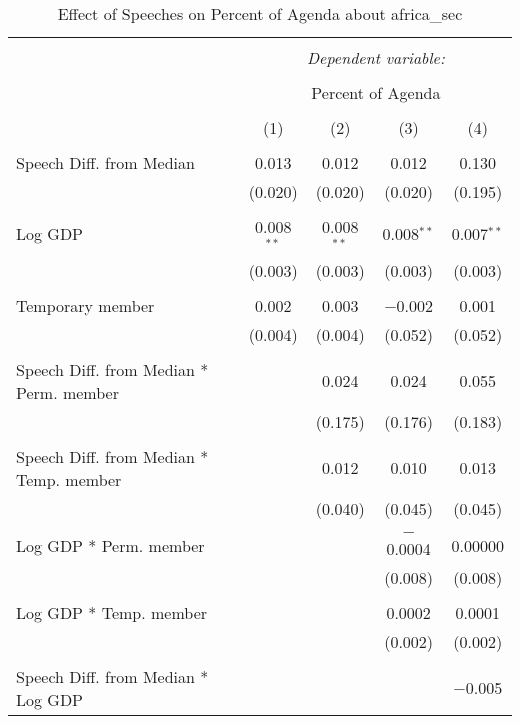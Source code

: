 
\begin{table}[!htbp] \centering 
  \caption{Effect of Speeches on Percent of Agenda about africa_sec} 
  \label{} 
\begin{tabular}{@{\extracolsep{5pt}}lcccc} 
\\[-1.8ex]\hline 
\hline \\[-1.8ex] 
 & \multicolumn{4}{c}{\textit{Dependent variable:}} \\ 
\cline{2-5} 
\\[-1.8ex] & \multicolumn{4}{c}{Percent of Agenda} \\ 
\\[-1.8ex] & (1) & (2) & (3) & (4)\\ 
\hline \\[-1.8ex] 
 Speech Diff. from Median & 0.013 & 0.012 & 0.012 & 0.130 \\ 
  & (0.020) & (0.020) & (0.020) & (0.195) \\ 
  & & & & \\ 
 Log GDP & 0.008$^{**}$ & 0.008$^{**}$ & 0.008$^{**}$ & 0.007$^{**}$ \\ 
  & (0.003) & (0.003) & (0.003) & (0.003) \\ 
  & & & & \\ 
 Temporary member & 0.002 & 0.003 & $-$0.002 & 0.001 \\ 
  & (0.004) & (0.004) & (0.052) & (0.052) \\ 
  & & & & \\ 
 Speech Diff. from Median * Perm. member &  & 0.024 & 0.024 & 0.055 \\ 
  &  & (0.175) & (0.176) & (0.183) \\ 
  & & & & \\ 
 Speech Diff. from Median * Temp. member &  & 0.012 & 0.010 & 0.013 \\ 
  &  & (0.040) & (0.045) & (0.045) \\ 
  & & & & \\ 
 Log GDP * Perm. member &  &  & $-$0.0004 & 0.00000 \\ 
  &  &  & (0.008) & (0.008) \\ 
  & & & & \\ 
 Log GDP * Temp. member &  &  & 0.0002 & 0.0001 \\ 
  &  &  & (0.002) & (0.002) \\ 
  & & & & \\ 
 Speech Diff. from Median * Log GDP &  &  &  & $-$0.005 \\ 

\end{tabular}
\end{table}
